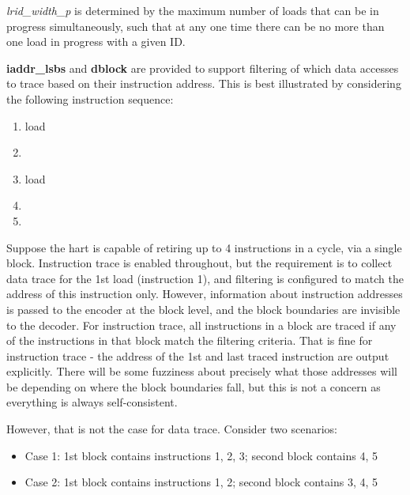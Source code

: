 \textit{lrid\_width\_p} is determined by the maximum number of loads that can be in progress simultaneously, such
that at any one time there can be no more than one load in progress with a given ID.

\textbf{iaddr\_lsbs} and \textbf{dblock} are provided to support filtering of which data accesses to trace
based on their instruction address.  This is best illustrated by considering the following instruction sequence:

\begin{enumerate}
  \item load
  \item <some non data access instruction>
  \item load
  \item <some non data access instruction>
  \item <some non data access instruction>
\end{enumerate}
 
Suppose the hart is capable of retiring up to 4 instructions in a cycle, via a single block.   Instruction trace is 
enabled throughout, but the requirement is to collect data trace for the 1st load (instruction 1), and filtering is
configured to match the address of this instruction only.  However, information about instruction addresses is passed 
to the encoder at the block level, and the block boundaries are invisible to the decoder.  For instruction trace, 
all instructions in a block are traced if any of the instructions in that block match the filtering criteria.  
That is fine for instruction trace - the address of the 1st and last traced instruction are output explicitly.  
There will be some fuzziness about precisely what those addresses will be depending on where the block boundaries 
fall, but this is not a concern as everything is always self-consistent.
 
However, that is not the case for data trace.  Consider two scenarios:

\begin{itemize}
  \item Case 1: 1st block contains instructions 1, 2, 3; second block contains 4, 5
  \item Case 2: 1st block contains instructions 1, 2; second block contains 3, 4, 5
\end{itemize}
 
